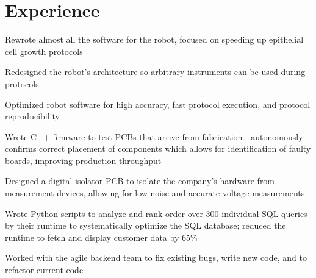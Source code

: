 \documentclass[]{deedy-resume-openfont}
\begin{document}

\section{Experience}

\begin{tightemize}
	\item Rewrote almost all the software for the robot, focused on speeding up epithelial cell growth protocols
	\item Redesigned the robot's architecture so arbitrary instruments can be used during protocols
	\item Optimized robot software for high accuracy, fast protocol execution, and protocol reproducibility
\end{tightemize}

\vspace{8pt}

\begin{tightemize}
    \item Wrote C++ firmware to test PCBs that arrive from fabrication - autonomously confirms correct placement of components which allows for identification of faulty boards, improving production throughput
    \item Designed a digital isolator PCB to isolate the company's hardware from measurement devices, allowing for low-noise and accurate voltage measurements
\end{tightemize}
\vspace{8pt}

\begin{tightemize}
    \item Wrote Python scripts to analyze and rank order over 300 individual SQL queries by their runtime to systematically optimize the SQL database; reduced the runtime to fetch and display customer data by 65\%
    \item Worked with the agile backend team to fix existing bugs, write new code, and to refactor current code
\end{tightemize}
\vspace{12pt}
\end{document}
